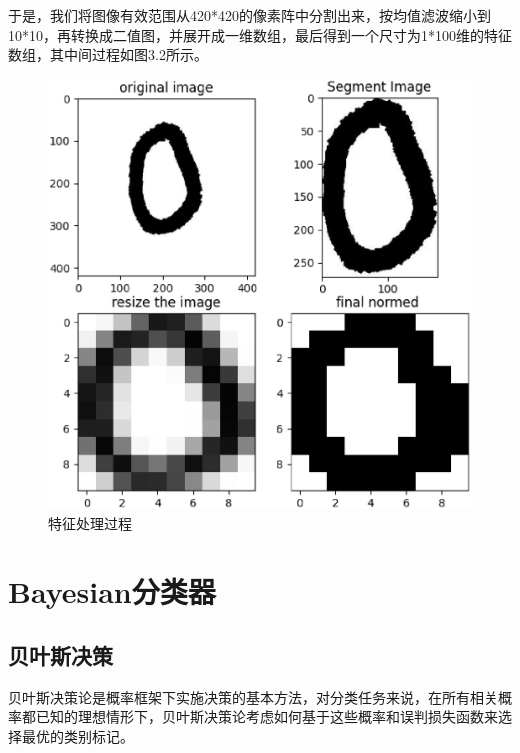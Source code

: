 \documentclass[UTF8, a4paper, 12pt]{report}
\begin{document}
			于是，我们将图像有效范围从420*420的像素阵中分割出来，按均值滤波缩小到10*10，再转换成二值图，并展开成一维数组，最后得到一个尺寸为1*100维的特征数组，其中间过程如图3.2所示。
			\begin{figure}[!h]
			\centering
			\includegraphics[scale=0.35]{./img/FeatureMapping.eps}
			\caption{特征处理过程}
			\label{fig:3.2}
			\end{figure}
\clearpage

\chapter{Bayesian分类器}
	\section{贝叶斯决策}
			贝叶斯决策论是概率框架下实施决策的基本方法，对分类任务来说，在所有相关概率都已知的理想情形下，贝叶斯决策论考虑如何基于这些概率和误判损失函数来选择最优的类别标记。
\end{document}
